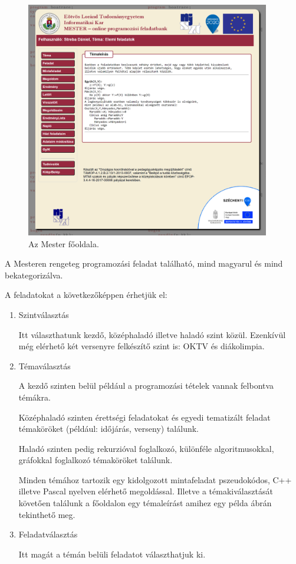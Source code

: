 \begin{figure}[h]
    \centering
    \includegraphics[width=0.95\textwidth]{images/mester.png}
    \caption{Az Mester főoldala.}
    \label{fig:mester}
\end{figure}

A Mesteren rengeteg programozási feladat található, mind magyarul és mind bekategorizálva.

A feladatokat a következőképpen érhetjük el:
\begin{enumerate}
    \item Szintválasztás

          Itt választhatunk kezdő, középhaladó illetve haladó szint közül. Ezenkívül még elérhető két versenyre felkészítő szint is: OKTV és diákolimpia.

    \item Témaválasztás

          A kezdő szinten belül például a programozási tételek vannak felbontva témákra.

          Középhaladó szinten érettségi feladatokat és egyedi tematizált feladat témaköröket (például: időjárás, verseny) találunk.

          Haladó szinten pedig rekurzióval foglalkozó, különféle algoritmusokkal, gráfokkal foglalkozó témaköröket találunk.

          Minden témához tartozik egy kidolgozott mintafeladat pszeudokódos, C++ illetve Pascal nyelven elérhető megoldással. Illetve a témakiválasztását követően találunk a főoldalon egy témaleírást amihez egy példa  ábrán tekinthető meg.

    \item Feladatválasztás

          Itt magát a témán belüli feladatot választhatjuk ki.
\end{enumerate}

